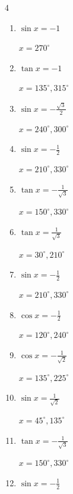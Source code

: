 \begin{multicols}{4}
\begin{enumerate}
  \item $\displaystyle \sin{x}  = -1$

        $\displaystyle x = 270^{\circ}$

  \item $\displaystyle \tan{x}  = -1$

        $\displaystyle x = 135^{\circ} , 315^{\circ}$

  \item $\displaystyle \sin{x}  = -\frac{\sqrt{3}}{2}$

        $\displaystyle x = 240^{\circ} , 300^{\circ}$

  \item $\displaystyle \sin{x}  = -\frac{1}{2}$

        $\displaystyle x = 210^{\circ} , 330^{\circ}$

  \item $\displaystyle \tan{x}  = -\frac{1}{\sqrt{3}}$

        $\displaystyle x = 150^{\circ} , 330^{\circ}$

  \item $\displaystyle \tan{x}  = \frac{1}{\sqrt{3}}$

        $\displaystyle x = 30^{\circ} , 210^{\circ}$

  \item $\displaystyle \sin{x}  = -\frac{1}{2}$

        $\displaystyle x = 210^{\circ} , 330^{\circ}$

  \item $\displaystyle \cos{x}  = -\frac{1}{2}$

        $\displaystyle x = 120^{\circ} , 240^{\circ}$

  \item $\displaystyle \cos{x}  = -\frac{1}{\sqrt{2}}$

        $\displaystyle x = 135^{\circ} , 225^{\circ}$

  \item $\displaystyle \sin{x}  = \frac{1}{\sqrt{2}}$

        $\displaystyle x = 45^{\circ} , 135^{\circ}$

  \item $\displaystyle \tan{x}  = -\frac{1}{\sqrt{3}}$

        $\displaystyle x = 150^{\circ} , 330^{\circ}$

\columnbreak %

  \item $\displaystyle \sin{x}  = -\frac{1}{2}$


\end{enumerate}
\end{multicols}
